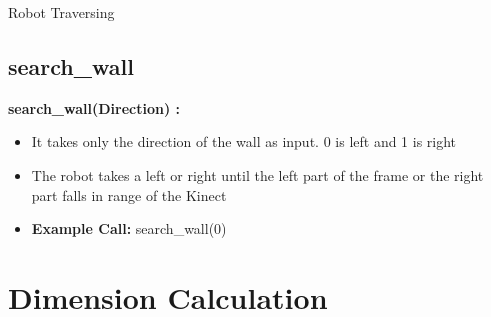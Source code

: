 \documentclass[10pt, a4paper]{beamer}
\begin{document}
\begin{frame}[allowframebreaks]{Robot Traversing}
  \subsection{search\_wall}
    \textbf{search\_wall(Direction) : }
      \begin{itemize}
       \item It takes only the direction of the wall as input. 0 is left and 1 is right
       \item The robot takes a left or right until the left part of the frame or the right part falls in range of the Kinect
       \item \textbf{Example Call:} search\_wall(0)
      \end{itemize}
\end{frame}

\section{Dimension Calculation}
\end{document}
